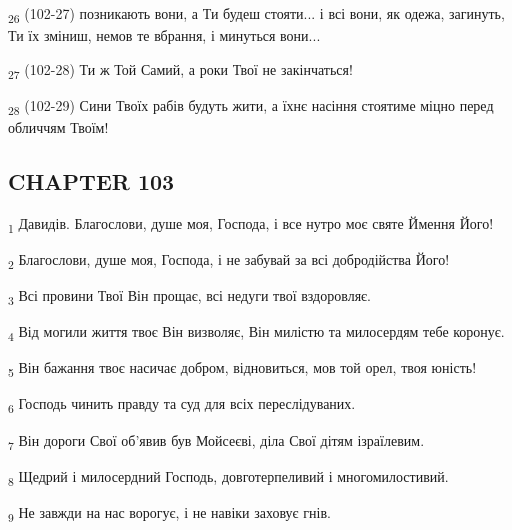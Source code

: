 \begin{tcolorbox}
\textsubscript{26} (102-27) позникають вони, а Ти будеш стояти... і всі вони, як одежа, загинуть, Ти їх зміниш, немов те вбрання, і минуться вони...
\end{tcolorbox}
\begin{tcolorbox}
\textsubscript{27} (102-28) Ти ж Той Самий, а роки Твої не закінчаться!
\end{tcolorbox}
\begin{tcolorbox}
\textsubscript{28} (102-29) Сини Твоїх рабів будуть жити, а їхнє насіння стоятиме міцно перед обличчям Твоїм!
\end{tcolorbox}
\subsection{CHAPTER 103}
\begin{tcolorbox}
\textsubscript{1} Давидів. Благослови, душе моя, Господа, і все нутро моє святе Ймення Його!
\end{tcolorbox}
\begin{tcolorbox}
\textsubscript{2} Благослови, душе моя, Господа, і не забувай за всі добродійства Його!
\end{tcolorbox}
\begin{tcolorbox}
\textsubscript{3} Всі провини Твої Він прощає, всі недуги твої вздоровляє.
\end{tcolorbox}
\begin{tcolorbox}
\textsubscript{4} Від могили життя твоє Він визволяє, Він милістю та милосердям тебе коронує.
\end{tcolorbox}
\begin{tcolorbox}
\textsubscript{5} Він бажання твоє насичає добром, відновиться, мов той орел, твоя юність!
\end{tcolorbox}
\begin{tcolorbox}
\textsubscript{6} Господь чинить правду та суд для всіх переслідуваних.
\end{tcolorbox}
\begin{tcolorbox}
\textsubscript{7} Він дороги Свої об'явив був Мойсеєві, діла Свої дітям ізраїлевим.
\end{tcolorbox}
\begin{tcolorbox}
\textsubscript{8} Щедрий і милосердний Господь, довготерпеливий і многомилостивий.
\end{tcolorbox}
\begin{tcolorbox}
\textsubscript{9} Не завжди на нас ворогує, і не навіки заховує гнів.
\end{tcolorbox}
